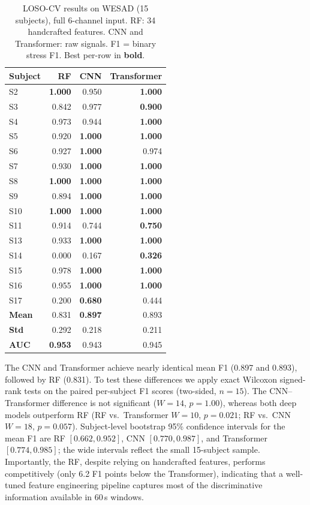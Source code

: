 \documentclass[10pt,twocolumn]{article}
\begin{document}
\begin{table}[t]
  \centering
  \caption{LOSO-CV results on WESAD (15 subjects), full 6-channel input.
           RF: 34 handcrafted features. CNN and Transformer: raw signals.
           F1 = binary stress F1. Best per-row in \textbf{bold}.}
  \label{tab:main}
  \small
  \begin{tabular}{lrrr}
    \toprule
    Subject & RF & CNN & Transformer \\
    \midrule
    S2  & \textbf{1.000} & 0.950 & \textbf{1.000} \\
    S3  & 0.842 & 0.977 & \textbf{0.900} \\
    S4  & 0.973 & 0.944 & \textbf{1.000} \\
    S5  & 0.920 & \textbf{1.000} & \textbf{1.000} \\
    S6  & 0.927 & \textbf{1.000} & 0.974 \\
    S7  & 0.930 & \textbf{1.000} & \textbf{1.000} \\
    S8  & \textbf{1.000} & \textbf{1.000} & \textbf{1.000} \\
    S9  & 0.894 & \textbf{1.000} & \textbf{1.000} \\
    S10 & \textbf{1.000} & \textbf{1.000} & \textbf{1.000} \\
    S11 & 0.914 & 0.744 & \textbf{0.750} \\
    S13 & 0.933 & \textbf{1.000} & \textbf{1.000} \\
    S14 & 0.000 & 0.167 & \textbf{0.326} \\
    S15 & 0.978 & \textbf{1.000} & \textbf{1.000} \\
    S16 & 0.955 & \textbf{1.000} & \textbf{1.000} \\
    S17 & 0.200 & \textbf{0.680} & 0.444 \\
    \midrule
    \textbf{Mean} & 0.831 & \textbf{0.897} & 0.893 \\
    \textbf{Std}  & 0.292 & 0.218 & 0.211 \\
    \textbf{AUC}  & \textbf{0.953} & 0.943 & 0.945 \\
    \bottomrule
  \end{tabular}
\end{table}

The CNN and Transformer achieve nearly identical mean F1 (0.897 and 0.893),
followed by RF (0.831). To test these differences we apply exact Wilcoxon
signed-rank tests on the paired per-subject F1 scores (two-sided, $n=15$).
The CNN--Transformer difference is not significant ($W=14$, $p=1.00$),
whereas both deep models outperform RF (RF vs.\ Transformer $W=10$,
$p=0.021$; RF vs.\ CNN $W=18$, $p=0.057$). Subject-level bootstrap 95\%
confidence intervals for the mean F1 are RF $[0.662, 0.952]$,
CNN $[0.770, 0.987]$, and Transformer $[0.774, 0.985]$; the wide intervals
reflect the small 15-subject sample.
Importantly, the RF, despite relying on handcrafted features, performs
competitively (only 6.2 F1 points below the Transformer), indicating
that a well-tuned feature engineering pipeline captures most of the
discriminative information available in 60\,s windows.
\end{document}

